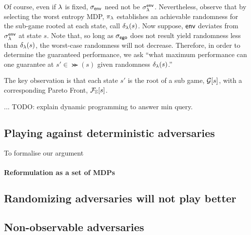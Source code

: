 Of course, even if $\lambda$ is fixed, ${\sigma_{\mathsf{env}}}$ need not be
$\sigma^{\mathsf{env}}_\lambda$. Nevertheless, observe that by selecting the worst
entropy MDP, $\pi_\lambda$ establishes an achievable randomness for the
sub-game rooted at each state, call $\delta_\lambda(s)$. Now suppose,
$\mathsf{env}$ deviates from $\sigma_\lambda^{\mathsf{env}}$ at state $s$. Note that, so
long as ${\sigma_{\mathsf{ego}}}$ does not result yield randomness less than
$\delta_\lambda(s)$, the worst-case randomness will not decrease.
Therefore, in order to determine the guaranteed performance, we
ask ``what maximum performance can one guarantee at $s' \in
\Succ(s)$ given randomness $\delta_\lambda(s)$.''
\begin{mdframed}
The key observation is that each state $s'$ is the root of a sub game,
$\mathcal{G}[s]$, with a corresponding Pareto Front, $\mathcal{F}_{\mathbb{S}}[s]$.
\end{mdframed}
... TODO: explain dynamic programming to answer min query.




\subsection{Playing against deterministic adversaries}
To formalise our argument
\paragraph{Reformulation as a set of MDPs}

\paragraph{}


\subsection{Randomizing adversaries will not play better}

\subsection{Non-observable adversaries}

